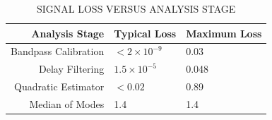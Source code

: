 \documentclass[twocolumn,numberedappendix]{emulateapj} \shorttitle{PSA64}
\begin{document}
\begin{table}[htdp]
\caption{SIGNAL LOSS VERSUS ANALYSIS STAGE}
\begin{center}
\begin{tabular}{rll}
Analysis Stage & Typical Loss & Maximum Loss \\
\hline
Bandpass Calibration &  $< 2 \times 10^{-9}$ & 0.03 \\
Delay Filtering & $1.5\times10^{-5}$ & 0.048 \\
Quadratic Estimator & $<0.02$ & 0.89 \\
Median of Modes & 1.4 & 1.4 \\
\end{tabular}
\end{center}
\label{tbl:sigloss}
\end{table}%





\end{document}
